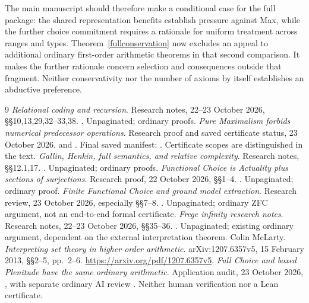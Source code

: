 \documentclass[11pt]{article}
\begin{document}
The main manuscript should therefore make a conditional case for the full package: the shared representation benefits establish pressure against Max, while the further choice commitment requires a rationale for uniform treatment across ranges and types. Theorem~\ref{fullconservation} now excludes an appeal to additional ordinary first-order arithmetic theorems in that second comparison. It makes the further rationale concern selection and consequences outside that fragment. Neither conservativity nor the number of axioms by itself establishes an abductive preference.

\begin{thebibliography}{9}
\emph{Relational coding and recursion}. Research notes, 22--23 October 2026, \S\S10,13,29,32--33,38. . Unpaginated; ordinary proofs.
\emph{Pure Maximalism forbids numerical predecessor operations}. Research proof and saved certificate status, 23 October 2026.  and . Final saved manifest: . Certificate scopes are distinguished in the text.
\emph{Gallin, Henkin, full semantics, and relative complexity}. Research notes, \S\S12.1,17. . Unpaginated; ordinary proofs.
\emph{Functional Choice is Actuality plus sections of surjections}. Research proof, 22 October 2026, \S\S1--4. . Unpaginated; ordinary proof.
\emph{Finite Functional Choice and ground model extraction}. Research review, 23 October 2026, especially \S\S7--8. . Unpaginated; ordinary ZFC argument, not an end-to-end formal certificate.
\emph{Frege infinity research notes}. Research notes, 22--23 October 2026, \S\S35--36. . Unpaginated; existing ordinary argument, dependent on the external interpretation theorem.
Colin McLarty. \emph{Interpreting set theory in higher order arithmetic}. arXiv:1207.6357v5, 15 February 2013, \S\S2--5, pp.~2--6. \url{https://arxiv.org/pdf/1207.6357v5}.
\emph{Full Choice and boxed Plenitude have the same ordinary arithmetic}. Application audit, 23 October 2026, , with separate ordinary AI review . Neither human verification nor a Lean certificate.
\end{thebibliography}
\end{document}
